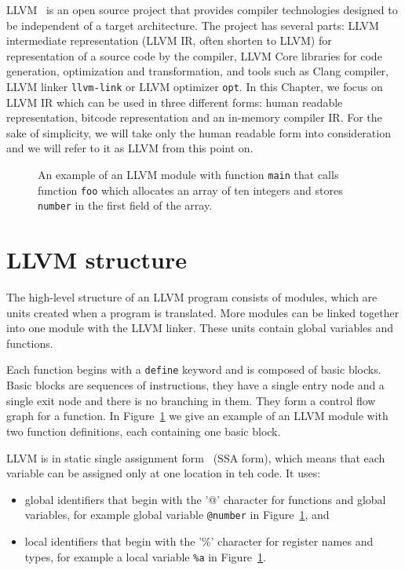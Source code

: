 LLVM~\cite{llvm} is an open source project that provides compiler technologies
designed to be independent of a target architecture. The project has several
parts: LLVM intermediate representation (LLVM IR, often shorten to LLVM) for
representation of a source code by the compiler, LLVM Core libraries for code
generation, optimization and transformation, and tools such as Clang compiler,
LLVM linker \texttt{llvm-link} or LLVM optimizer \texttt{opt}. In this Chapter,
we focus on LLVM IR which can be used in three different forms: human readable
representation, bitcode representation and an in-memory compiler IR. For the
sake of simplicity, we will take only the human readable form into
consideration and we will refer to it as LLVM from this point on.

\begin{figure}[h]
 
 \caption{An example of an LLVM module with function \texttt{main} that calls
 function \texttt{foo} which allocates an array of ten integers and stores
 \texttt{number} in the first field of the array.}
 \label{fig:llvm_example}
\end{figure}

\section{LLVM structure} %

The high-level structure of an LLVM program consists of modules, which are
units created when a program is translated. More modules can be linked together
into one module with the LLVM linker. These units contain global variables and
functions.

Each function begins with a \texttt{define} keyword and is composed of basic
blocks. Basic blocks are sequences of instructions, they have a single entry node
and a single exit node and there is no branching in them. They form
a control flow graph for a function. In Figure~\ref{fig:llvm_example} we give
an example of an LLVM module with two function definitions, each containing one
basic block.

LLVM is in static single assignment form~\cite{ssa} (SSA form), which means that each
variable can be assigned only at one location in teh code. It uses:

\begin{itemize}
    \item global identifiers that begin with the '@' character for functions
    and global variables, for example global variable \texttt{@number} in
    Figure~\ref{fig:llvm_example}, and
    \item local identifiers that begin with the '\%' character for register
    names and types, for example a local variable \texttt{\%a} in
    Figure~\ref{fig:llvm_example}.
\end{itemize}

